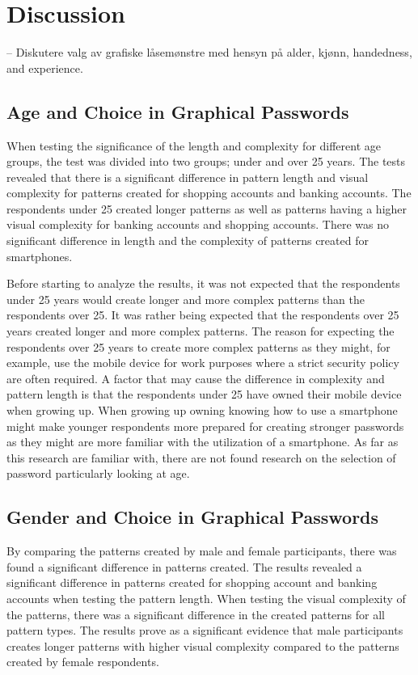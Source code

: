 \chapter{Discussion}\label{chap:discussion}

  -- Diskutere valg av grafiske låsemønstre med hensyn på alder, kjønn, handedness, and experience. 

  \clearpage

  \section{Age and Choice in Graphical Passwords}

    When testing the significance of the length and complexity for different age groups, the test was divided into two groups; under and over 25 years. The tests revealed that there is a significant difference in pattern length and visual complexity for patterns created for shopping accounts and banking accounts. The respondents under 25 created longer patterns as well as patterns having a higher visual complexity for banking accounts and shopping accounts. There was no significant difference in length and the complexity of patterns created for smartphones. 

    Before starting to analyze the results, it was not expected that the respondents under 25 years would create longer and more complex patterns than the respondents over 25. It was rather being expected that the respondents over 25 years created longer and more complex patterns. The reason for expecting the respondents over 25 years to create more complex patterns as they might, for example, use the mobile device for work purposes where a strict security policy are often required. A factor that may cause the difference in complexity and pattern length is that the respondents under 25 have owned their mobile device when growing up. When growing up owning knowing how to use a smartphone might make younger respondents more prepared for creating stronger passwords as they might are more familiar with the utilization of a smartphone. As far as this research are familiar with, there are not found research on the selection of password particularly looking at age.

  \section{Gender and Choice in Graphical Passwords}

    By comparing the patterns created by male and female participants, there was found a significant difference in patterns created. The results revealed a significant difference in patterns created for shopping account and banking accounts when testing the pattern length. When testing the visual complexity of the patterns, there was a significant difference in the created patterns for all pattern types. The results prove as a significant evidence that male participants creates longer patterns with higher visual complexity compared to the patterns created by female respondents.


